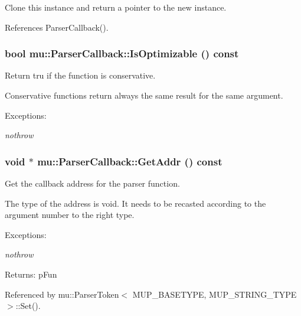 Clone this instance and return a pointer to the new instance. 



References ParserCallback().
\subsubsection[IsOptimizable]{\setlength{\rightskip}{0pt plus 5cm}bool mu::ParserCallback::IsOptimizable () const}\label{classmu_1_1ParserCallback_b899146ccc02b1a7a7245694821ba618}


Return tru if the function is conservative. 

Conservative functions return always the same result for the same argument. \begin{Desc}
\item[Exceptions:]
\begin{description}
\item[{\em nothrow}]\end{description}
\end{Desc}
\subsubsection[GetAddr]{\setlength{\rightskip}{0pt plus 5cm}void $\ast$ mu::ParserCallback::GetAddr () const}\label{classmu_1_1ParserCallback_509c3106a4adea192e3f8044898e18a7}


Get the callback address for the parser function. 

The type of the address is void. It needs to be recasted according to the argument number to the right type.

\begin{Desc}
\item[Exceptions:]
\begin{description}
\item[{\em nothrow}]\end{description}
\end{Desc}
\begin{Desc}
\item[Returns:]pFun \end{Desc}


Referenced by mu::ParserToken$<$ MUP\_\-BASETYPE, MUP\_\-STRING\_\-TYPE $>$::Set().
